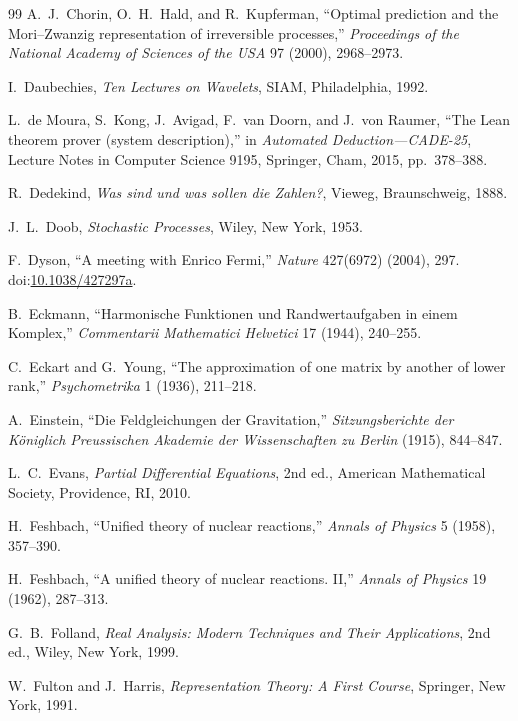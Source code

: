 \begin{thebibliography}{99}
A.~J.~Chorin, O.~H.~Hald, and R.~Kupferman,
``Optimal prediction and the Mori--Zwanzig representation of irreversible processes,''
\emph{Proceedings of the National Academy of Sciences of the USA} 97 (2000), 2968--2973.

I.~Daubechies,
\emph{Ten Lectures on Wavelets},
SIAM, Philadelphia, 1992.

L.~de Moura, S.~Kong, J.~Avigad, F.~van Doorn, and J.~von Raumer,
``The Lean theorem prover (system description),''
in \emph{Automated Deduction---CADE-25},
Lecture Notes in Computer Science 9195,
Springer, Cham, 2015, pp.~378--388.

R.~Dedekind,
\emph{Was sind und was sollen die Zahlen?},
Vieweg, Braunschweig, 1888.

J.~L.~Doob,
\emph{Stochastic Processes},
Wiley, New York, 1953.

F.~Dyson,
``A meeting with Enrico Fermi,''
\emph{Nature} 427(6972) (2004), 297.
doi:\href{https://doi.org/10.1038/427297a}{10.1038/427297a}.

B.~Eckmann,
``Harmonische Funktionen und Randwertaufgaben in einem Komplex,''
\emph{Commentarii Mathematici Helvetici} 17 (1944), 240--255.

C.~Eckart and G.~Young,
``The approximation of one matrix by another of lower rank,''
\emph{Psychometrika} 1 (1936), 211--218.

A.~Einstein,
``Die Feldgleichungen der Gravitation,''
\emph{Sitzungsberichte der K\"oniglich Preussischen Akademie der Wissenschaften zu Berlin}
(1915), 844--847.

L.~C.~Evans,
\emph{Partial Differential Equations},
2nd ed., American Mathematical Society, Providence, RI, 2010.

H.~Feshbach,
``Unified theory of nuclear reactions,''
\emph{Annals of Physics} 5 (1958), 357--390.

H.~Feshbach,
``A unified theory of nuclear reactions. II,''
\emph{Annals of Physics} 19 (1962), 287--313.

G.~B.~Folland,
\emph{Real Analysis: Modern Techniques and Their Applications},
2nd ed., Wiley, New York, 1999.

W.~Fulton and J.~Harris,
\emph{Representation Theory: A First Course},
Springer, New York, 1991.


\end{thebibliography}
